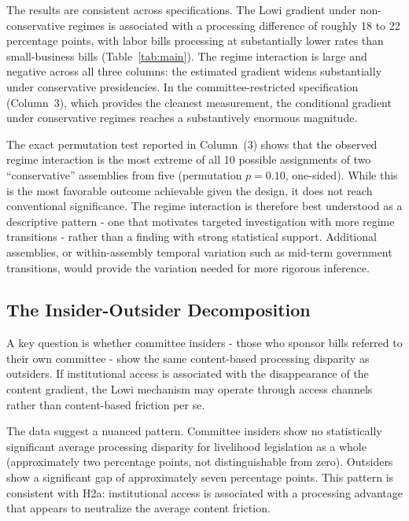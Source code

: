 \documentclass[11pt]{article}
\begin{document}
The results are consistent across specifications. The Lowi gradient under non-conservative regimes is associated with a processing difference of roughly 18 to 22 percentage points, with labor bills processing at substantially lower rates than small-business bills (Table~\ref{tab:main}). The regime interaction is large and negative across all three columns: the estimated gradient widens substantially under conservative presidencies. In the committee-restricted specification (Column~3), which provides the cleanest measurement, the conditional gradient under conservative regimes reaches a substantively enormous magnitude.

The exact permutation test reported in Column~(3) shows that the observed regime interaction is the most extreme of all 10 possible assignments of two ``conservative'' assemblies from five (permutation $p = 0.10$, one-sided). While this is the most favorable outcome achievable given the design, it does not reach conventional significance. The regime interaction is therefore best understood as a descriptive pattern - one that motivates targeted investigation with more regime transitions - rather than a finding with strong statistical support. Additional assemblies, or within-assembly temporal variation such as mid-term government transitions, would provide the variation needed for more rigorous inference.

\subsection{The Insider-Outsider Decomposition}
\label{sec:results-insider}

A key question is whether committee insiders - those who sponsor bills referred to their own committee - show the same content-based processing disparity as outsiders. If institutional access is associated with the disappearance of the content gradient, the Lowi mechanism may operate through access channels rather than content-based friction per se.

The data suggest a nuanced pattern. Committee insiders show no statistically significant average processing disparity for livelihood legislation as a whole (approximately two percentage points, not distinguishable from zero). Outsiders show a significant gap of approximately seven percentage points. This pattern is consistent with H2a: institutional access is associated with a processing advantage that appears to neutralize the average content friction.
\end{document}
